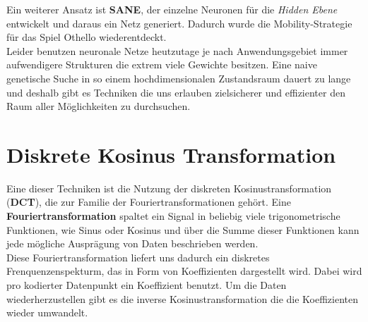             \noindent
            Ein weiterer Ansatz ist \textbf{SANE}\cite{moriarty1999evolutionary}, der einzelne Neuronen für die \textit{Hidden Ebene} entwickelt und daraus ein Netz generiert. Dadurch wurde die Mobility-Strategie für das Spiel Othello wiederentdeckt. \\

            \noindent
            Leider benutzen neuronale Netze heutzutage je nach Anwendungsgebiet immer aufwendigere Strukturen die extrem viele Gewichte besitzen. Eine naive genetische Suche in so einem hochdimensionalen Zustandsraum dauert zu lange und deshalb gibt es Techniken die uns erlauben zielsicherer und effizienter den Raum aller Möglichkeiten zu durchsuchen.


    \section{Diskrete Kosinus Transformation}

        Eine dieser Techniken ist die Nutzung der diskreten Kosinustransformation (\textbf{DCT}), die zur Familie der Fouriertransformationen gehört. Eine \textbf{Fouriertransformation} spaltet ein Signal in beliebig viele trigonometrische Funktionen, wie Sinus oder Kosinus und über die Summe dieser Funktionen kann jede mögliche Ausprägung von Daten beschrieben werden. \\

        \noindent
        Diese Fouriertransformation liefert uns dadurch ein diskretes Frenquenzenspekturm, das in Form von Koeffizienten dargestellt wird. Dabei wird pro kodierter Datenpunkt ein Koeffizient benutzt. Um die Daten wiederherzustellen gibt es die inverse Kosinustransformation die die Koeffizienten wieder umwandelt.

